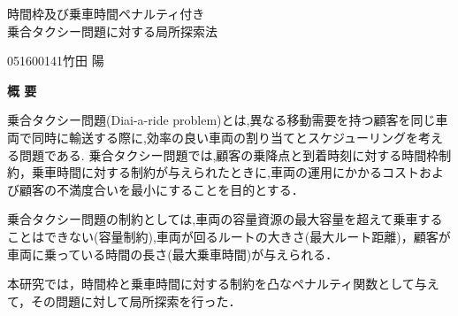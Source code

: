\begin{center}
{\LARGE 時間枠及び乗車時間ペナルティ付き\\乗合タクシー問題に対する局所探索法}\\[0.5cm]
\end{center}
\hfill
{\large 051600141\qquad 竹田 陽}\\[0.5cm]
\begin{center}
{\Large \bf 概 要}\\
\end{center}


乗合タクシー問題(Diai-a-ride problem)とは,異なる移動需要を持つ顧客を同じ車両で同時に輸送する際に,効率の良い車両の割り当てとスケジューリングを考える問題である. 乗合タクシー問題では,顧客の乗降点と到着時刻に対する時間枠制約，乗車時間に対する制約が与えられたときに,車両の運用にかかるコストおよび顧客の不満度合いを最小にすることを目的とする．

乗合タクシー問題の制約としては,車両の容量資源の最大容量を超えて乗車することはできない(容量制約),車両が回るルートの大きさ(最大ルート距離)，顧客が車両に乗っている時間の長さ(最大乗車時間)が与えられる．

本研究では，時間枠と乗車時間に対する制約を凸なペナルティ関数として与えて，その問題に対して局所探索を行った．
